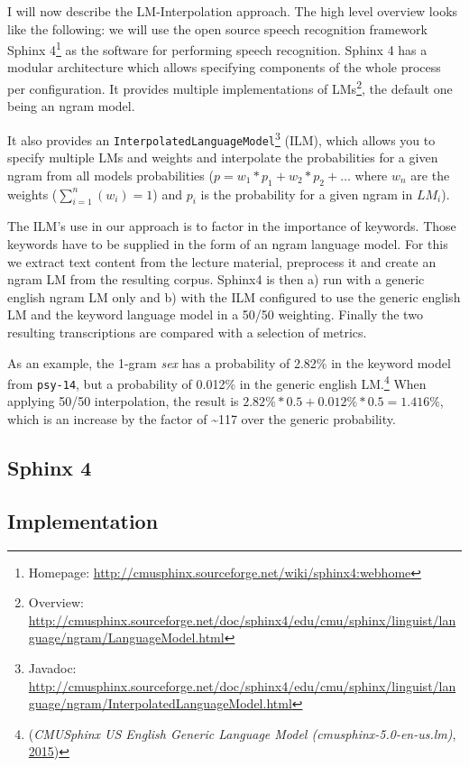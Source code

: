 \documentclass[]{article}
\begin{document}
I will now describe the LM-Interpolation approach. The high level
overview looks like the following: we will use the open source speech
recognition framework Sphinx 4\footnote{Homepage:
  \url{http://cmusphinx.sourceforge.net/wiki/sphinx4:webhome}} as the
software for performing speech recognition. Sphinx 4 has a modular
architecture which allows specifying components of the whole process per
configuration. It provides multiple implementations of LMs\footnote{Overview:
  \url{http://cmusphinx.sourceforge.net/doc/sphinx4/edu/cmu/sphinx/linguist/language/ngram/LanguageModel.html}},
the default one being an ngram model.

It also provides an \texttt{InterpolatedLanguageModel}\footnote{Javadoc:
  \url{http://cmusphinx.sourceforge.net/doc/sphinx4/edu/cmu/sphinx/linguist/language/ngram/InterpolatedLanguageModel.html}}
(ILM), which allows you to specify multiple LMs and weights and
interpolate the probabilities for a given ngram from all models
probabilities (\(p = w_1*p_1 + w_2*p_2 + \ldots\) where \(w_n\) are the
weights (\(\sum_{i=1}^n(w_i) = 1\)) and \(p_i\) is the probability for a
given ngram in \(LM_i\)).

The ILM's use in our approach is to factor in the importance of
keywords. Those keywords have to be supplied in the form of an ngram
language model. For this we extract text content from the lecture
material, preprocess it and create an ngram LM from the resulting
corpus. Sphinx4 is then a) run with a generic english ngram LM only and
b) with the ILM configured to use the generic english LM and the keyword
language model in a 50/50 weighting. Finally the two resulting
transcriptions are compared with a selection of metrics.

As an example, the 1-gram \emph{sex} has a probability of 2.82\% in the
keyword model from \texttt{psy-14}, but a probability of 0.012\% in the
generic english LM.\footnote{(\emph{CMUSphinx US English Generic
  Language Model (cmusphinx-5.0-en-us.lm)}, \hyperref[ref-cmuLm]{2015})}
When applying 50/50 interpolation, the result is
\(2.82\%*0.5 + 0.012\%*0.5 = 1.416\%\), which is an increase by the
factor of \textasciitilde{}117 over the generic probability.

\subsection{Sphinx 4}\label{sphinx-4}

\subsection{Implementation}\label{implementation}
\end{document}
